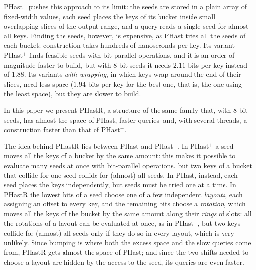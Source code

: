 \documentclass[11pt]{article}
\newcommand{\PHast}{PHast\xspace}
\newcommand{\PHastP}{PHast$^+$\xspace}
\newcommand{\PHastR}{PHastR\xspace}
\begin{document}
\PHast~\cite{BeSPHast} pushes this approach to its limit: the seeds are
stored in a plain array of fixed-width values, each seed places the keys of
its bucket inside small overlapping slices of the output range, and a query
reads a single seed for almost all keys. Finding the seeds, however, is
expensive, as \PHast tries all the seeds of each bucket: construction takes
hundreds of nanoseconds per key. Its variant \PHastP finds feasible seeds
with bit-parallel operations, and it is an order of magnitude faster to
build, but with 8-bit seeds it needs $2.11$ bits per key instead of $1.88$.
Its variants \emph{with wrapping}, in which keys wrap around the end of their
slices, need less space ($1.94$ bits per key for the best one, that is, the
one using the least space), but they are slower to build.

In this paper we present \PHastR, a structure of the same family that, with
8-bit seeds, has almost the space of \PHast, faster queries, and, with
several threads, a construction faster than that of \PHastP.

The idea behind \PHastR lies between \PHast and \PHastP. In \PHastP a seed
moves all the keys of a bucket by the same amount: this makes it possible to
evaluate many seeds at once with bit-parallel operations, but two keys of a
bucket that collide for one seed collide for (almost) all seeds. In \PHast,
instead, each seed places the keys independently, but seeds must be tried
one at a time. In \PHastR the lowest bits of a seed choose one of a few
independent \emph{layouts}, each assigning an offset to every key, and the
remaining bits choose a \emph{rotation}, which moves all the keys of the
bucket by the same amount along their \emph{rings} of slots: all the rotations of a layout can be evaluated at
once, as in \PHastP, but two keys collide for (almost) all seeds only if they
do so in every layout, which is very unlikely. Since bumping is where both
the excess space and the slow queries come from, \PHastR gets almost the
space of \PHast; and since the two shifts needed to choose a layout are hidden by the
access to the seed, its queries are even faster.
\end{document}
